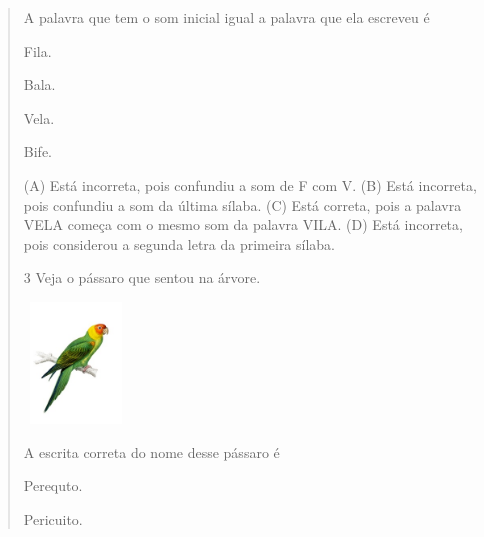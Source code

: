 \begin{verse}

A palavra que tem o som inicial igual a palavra que ela escreveu é

\begin{minipage}{.5\textwidth}
\begin{escolha}
\item Fila.

\item Bala.

\item Vela.

\item Bife.
\end{escolha}
\end{minipage}

(A) Está incorreta, pois confundiu a som de F com V.
(B) Está incorreta, pois confundiu a som da última sílaba.
(C) Está correta, pois a palavra VELA começa com o mesmo som da palavra VILA.
(D) Está incorreta, pois considerou a segunda letra da primeira sílaba.

\num{3} Veja o pássaro que sentou na árvore.

\includegraphics[width=1.08542in,height=1.27222in]{media/image165.jpeg}


A escrita correta do nome desse pássaro é

\begin{minipage}{.5\textwidth}
\begin{escolha}
\item Perequto.

\item Pericuito.


\end{escolha}
\end{minipage}
\end{verse}

